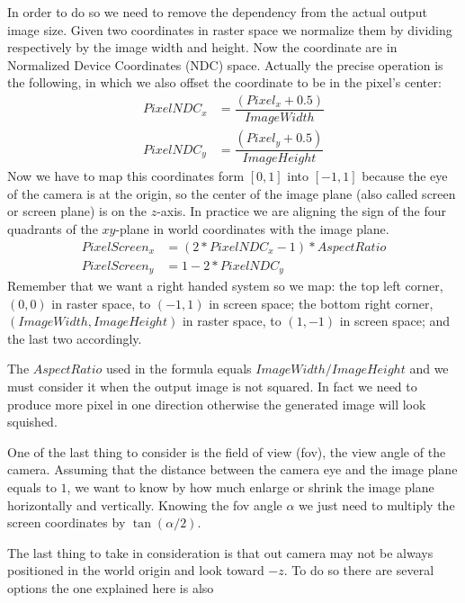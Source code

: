In order to do so we need to remove the dependency from the actual output image size.
Given two coordinates in raster space we normalize them by dividing respectively by the image width and height.
Now the coordinate are in Normalized Device Coordinates (NDC) space.
Actually the precise operation is the following, in which we also offset the coordinate to be in the pixel's center:
\begin{align*}
  PixelNDC_x &= \dfrac{(Pixel_x + 0.5)}{ImageWidth}\\
  PixelNDC_y &= \dfrac{(Pixel_y + 0.5)}{ImageHeight}
\end{align*}
Now we have to map this coordinates form $[0,1]$ into $[-1,1]$ because the eye of the camera is at the origin, so the center of the image plane (also called screen or screen plane) is on the $z$-axis.
In practice we are aligning the sign of the four quadrants of the $xy$-plane in world coordinates with the image plane.
\begin{align*}
  PixelScreen_x &= (2 * PixelNDC_x - 1) * AspectRatio\\
  PixelScreen_y &= 1 - 2 * PixelNDC_y
\end{align*}
Remember that we want a right handed system so we map:
the top left corner, $(0,0)$ in raster space, to $(-1,1)$ in screen space;
the bottom right corner, $(ImageWidth,ImageHeight)$ in raster space, to $(1,-1)$ in screen space; and the last two accordingly.

The $AspectRatio$ used in the formula equals $ImageWidth / ImageHeight$ and we must consider it when the output image is not squared.
In fact we need to produce more pixel in one direction otherwise the generated image will look squished.

One of the last thing to consider is the field of view (fov), the view angle of the camera.
Assuming that the distance between the camera eye and the image plane equals to $1$, we want to know by how much enlarge or shrink the image plane horizontally and vertically.
Knowing the fov angle $\alpha$ we just need to multiply the screen coordinates by $\tan(\alpha/2)$.

The last thing to take in consideration is that out camera may not be always positioned in the world origin and look toward $-z$.
To do so there are several options the one explained here is also 





